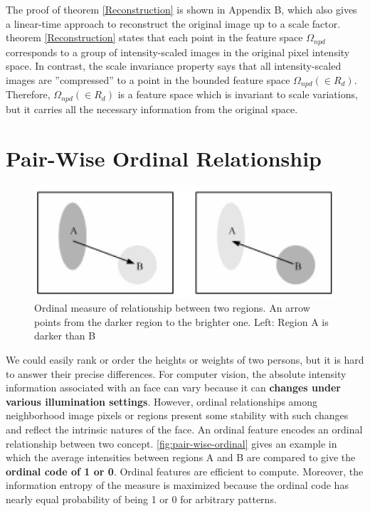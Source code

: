 \documentclass[a4paper,12pt]{article}
\begin{document}
\begin{compactitem}
The proof of theorem \ref{Reconstruction} is shown in Appendix B, which also gives a linear-time approach to reconstruct
the original image up to a scale factor. theorem \ref{Reconstruction} states that each point in the feature 
space $\Omega_{npd}$ corresponds to a group of intensity-scaled images in the original pixel intensity space. 
In contrast, the scale invariance property says that all intensity-scaled images are ''compressed'' to a point
in the bounded feature space $\Omega_{npd}  (\in R_d)$. Therefore, $\Omega_{npd}  (\in R_d)$ is a feature
space which is invariant to scale variations, but it carries all the necessary information from the original space.
\end{compactitem}

\section{Pair-Wise Ordinal Relationship}

\begin{figure}[h!]
  \centering
  \includegraphics[width=\textwidth, keepaspectratio=true]{pair-wise-ordinal.jpg}
  \caption{Ordinal measure of relationship between two regions. 
  An arrow points from the darker region to the brighter one. Left: Region A is darker than B}
 \label{fig:pair-wise-ordinal}
\end{figure}

We could easily rank or order the heights or weights of two persons, 
but it is hard to answer their precise differences. For computer vision, the absolute intensity
information associated with an face can vary because it can \textbf{changes under various illumination
settings}. However, ordinal relationships among neighborhood image pixels
or regions present some stability with such changes and reflect the intrinsic natures of the face.
An ordinal feature encodes an ordinal relationship between two concept. 
\autoref{fig:pair-wise-ordinal} gives an example in which the average intensities between regions A and B are compared
to give the \textbf{ordinal code of 1 or 0}. Ordinal features are efficient to compute. Moreover,
the information entropy of the measure is maximized because the ordinal code has
nearly equal probability of being 1 or 0 for arbitrary patterns. \cite{conf/icb/LiaoLZSLT06}
\end{document}
